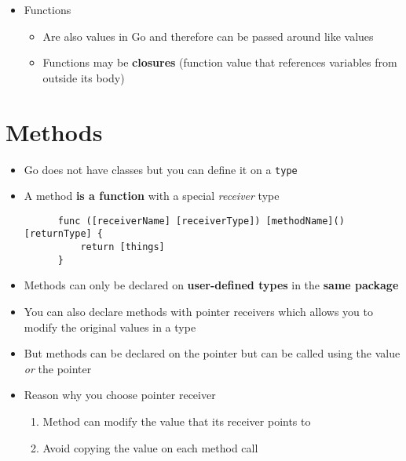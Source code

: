 \documentclass[11pt, oneside]{article}   	%
\begin{document}
\begin{itemize}
\begin{itemize}
\begin{description}
\begin{itemize}
               \end{itemize}
          \end{description}
      \end{itemize}
    \item Functions
      \begin{itemize}
        \item Are also values in Go and therefore can be passed around like values
        \item Functions may be \textbf{closures} (function value that references variables from outside its body)
      \end{itemize}
  \end{itemize}

\section{Methods}
  \begin{itemize}
    \item Go does not have classes but you can define it on a \texttt{type}
    \item A method \textbf{is a function} with a special \emph{receiver} type
    \begin{verbatim}
      func ([receiverName] [receiverType]) [methodName]() [returnType] {
          return [things]
      }
    \end{verbatim}
    \item Methods can only be declared on \textbf{user-defined types} in the \textbf{same package}
    \item You can also declare methods with pointer receivers which allows you to modify the original values in a type
    \item But methods can be declared on the pointer but can be called using the value \emph{or} the pointer
    \item Reason why you choose pointer receiver
      \begin{enumerate}
        \item Method can modify the value that its receiver points to
        \item Avoid copying the value on each method call
      \end{enumerate}
  \end{itemize}
\end{document}
